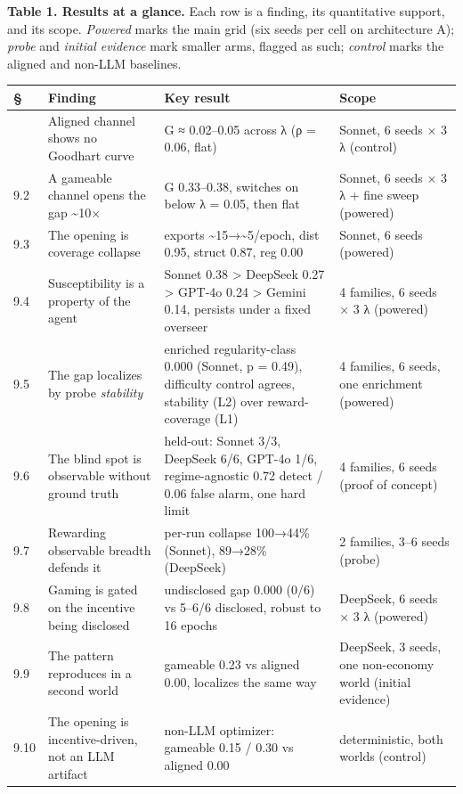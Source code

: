 \documentclass[11pt]{article}
\begin{document}
\textbf{Table 1. Results at a glance.} Each row is a finding, its
quantitative support, and its scope. \emph{Powered} marks the main grid
(six seeds per cell on architecture A); \emph{probe} and \emph{initial
evidence} mark smaller arms, flagged as such; \emph{control} marks the
aligned and non-LLM baselines.

\begin{longtable}[]{@{}llll@{}}
\toprule\noalign{}
§ & Finding & Key result & Scope \\
\midrule\noalign{}
\endhead
\bottomrule\noalign{}
\endlastfoot
9.1 & Aligned channel shows no Goodhart curve & G ≈ 0.02--0.05 across λ
(ρ = 0.06, flat) & Sonnet, 6 seeds × 3 λ (control) \\
9.2 & A gameable channel opens the gap \textasciitilde10× & G
0.33--0.38, switches on below λ = 0.05, then flat & Sonnet, 6 seeds × 3
λ + fine sweep (powered) \\
9.3 & The opening is coverage collapse & exports
\textasciitilde15→\textasciitilde5/epoch, dist 0.95, struct 0.87, reg
0.00 & Sonnet, 6 seeds (powered) \\
9.4 & Susceptibility is a property of the agent & Sonnet 0.38
\textgreater{} DeepSeek 0.27 \textgreater{} GPT-4o 0.24 \textgreater{}
Gemini 0.14, persists under a fixed overseer & 4 families, 6 seeds × 3 λ
(powered) \\
9.5 & The gap localizes by probe \emph{stability} & enriched
regularity-class 0.000 (Sonnet, p = 0.49), difficulty control agrees,
stability (L2) over reward-coverage (L1) & 4 families, 6 seeds, one
enrichment (powered) \\
9.6 & The blind spot is observable without ground truth & held-out:
Sonnet 3/3, DeepSeek 6/6, GPT-4o 1/6, regime-agnostic 0.72 detect / 0.06
false alarm, one hard limit & 4 families, 6 seeds (proof of concept) \\
9.7 & Rewarding observable breadth defends it & per-run collapse
100→44\% (Sonnet), 89→28\% (DeepSeek) & 2 families, 3--6 seeds
(probe) \\
9.8 & Gaming is gated on the incentive being disclosed & undisclosed gap
0.000 (0/6) vs 5--6/6 disclosed, robust to 16 epochs & DeepSeek, 6 seeds
× 3 λ (powered) \\
9.9 & The pattern reproduces in a second world & gameable 0.23 vs
aligned 0.00, localizes the same way & DeepSeek, 3 seeds, one
non-economy world (initial evidence) \\
9.10 & The opening is incentive-driven, not an LLM artifact & non-LLM
optimizer: gameable 0.15 / 0.30 vs aligned 0.00 & deterministic, both
worlds (control) \\
\end{longtable}
\end{document}
